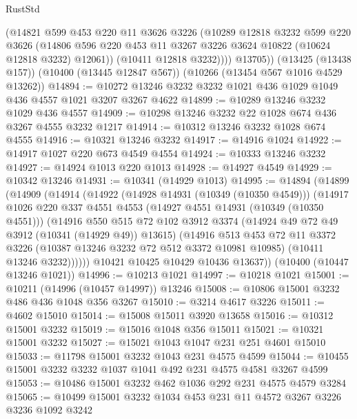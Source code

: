 \begin{lexlean}{RustStd}
\begin{coremodule}
{\begin{coremodule}
{{{{{{{{{{{{{{{{{{{{{{{{{            (@14821
              @599
              @453
              @220
              @11
              @3626
              @3226
              (@10289
                @12818
                @3232
                @599
                @220
                @3626
                (@14806 @596 @220 @453 @11 @3267 @3226 @3624 @10822 (@10624 @12818 @3232) @12061))
              (@10411 @12818 @3232))))
        @13705))
    (@13425 (@13438 @157))
    (@10400 (@13445 @12847 @567))
    (@10266 (@13454 @567 @1016 @4529 @13262))
@14894 := @10272 @13246 @3232 @3232 @1021 @436 @1029 @1049 @436 @4557 @1021 @3207 @3267 @4622
@14899 := @10289 @13246 @3232 @1029 @436 @4557
@14909 := @10298 @13246 @3232 @22 @1028 @674 @436 @3267 @4555 @3232 @1217
@14914 := @10312 @13246 @3232 @1028 @674 @4555
@14916 := @10321 @13246 @3232
@14917 := @14916 @1024
@14922 := @14917 @1027 @220 @673 @4549 @4554
@14924 := @10333 @13246 @3232
@14927 := @14924 @1013 @220 @1013
@14928 := @14927 @4549
@14929 := @10342 @13246
@14931 := @10341 (@14929 @1013)
@14995 := @14894
    (@14899
      (@14909
        (@14914
          (@14922
            (@14928 @14931 (@10349 (@10350 @4549)))
            (@14917
              @1026
              @220
              @337
              @4551
              @4553
              (@14927 @4551 @14931 (@10349 (@10350 @4551)))
              (@14916
                @550
                @515
                @72
                @102
                @3912
                @3374
                (@14924 @49 @72 @49 @3912 (@10341 (@14929 @49)) @13615)
                (@14916
                  @513
                  @453
                  @72
                  @11
                  @3372
                  @3226
                  (@10387 @13246 @3232 @72 @512 @3372 @10981 @10985)
                  (@10411 @13246 @3232))))))
        @10421
        @10425
        @10429
        @10436
        @13637))
    (@10400 (@10447 @13246 @1021))
@14996 := @10213 @1021
@14997 := @10218 @1021
@15001 := @10211 (@14996 (@10457 @14997)) @13246
@15008 := @10806 @15001 @3232 @486 @436 @1048 @356 @3267
@15010 := @3214 @4617 @3226
@15011 := @4602 @15010
@15014 := @15008 @15011 @3920 @13658
@15016 := @10312 @15001 @3232
@15019 := @15016 @1048 @356 @15011
@15021 := @10321 @15001 @3232
@15027 := @15021 @1043 @1047 @231 @251 @4601 @15010
@15033 := @11798 @15001 @3232 @1043 @231 @4575 @4599
@15044 := @10455 @15001 @3232 @3232 @1037 @1041 @492 @231 @4575 @4581 @3267 @4599
@15053 := @10486 @15001 @3232 @462 @1036 @292 @231 @4575 @4579 @3284
@15065 := @10499 @15001 @3232 @1034 @453 @231 @11 @4572 @3267 @3226 @3236 @1092 @3242
}}}}}}}}}}}}}}}}}}}}}}}}}
\end{coremodule}}
\end{coremodule}
\end{lexlean}
